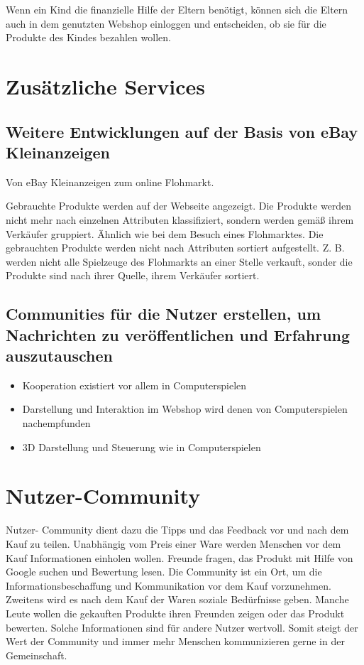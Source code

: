 Wenn ein Kind die finanzielle Hilfe der Eltern benötigt, können sich die Eltern auch in dem genutzten Webshop einloggen und entscheiden, ob sie für die Produkte des Kindes bezahlen wollen.


\section{Zusätzliche Services}


\subsection{Weitere Entwicklungen auf der Basis von eBay Kleinanzeigen}

Von eBay Kleinanzeigen zum online Flohmarkt.

Gebrauchte Produkte werden auf der Webseite angezeigt. Die Produkte werden nicht mehr nach einzelnen Attributen klassifiziert, sondern werden gemäß ihrem Verkäufer gruppiert. Ähnlich wie bei dem Besuch eines Flohmarktes. Die gebrauchten Produkte werden nicht nach Attributen sortiert aufgestellt. Z. B. werden nicht alle Spielzeuge des Flohmarkts an einer Stelle verkauft, sonder die Produkte sind nach ihrer Quelle, ihrem Verkäufer sortiert.


\subsection{Communities  für die Nutzer erstellen, um Nachrichten zu veröffentlichen und Erfahrung auszutauschen}

\begin{itemize}
\item Kooperation existiert vor allem in Computerspielen
\item Darstellung und Interaktion im Webshop wird denen von Computerspielen nachempfunden
\item 3D Darstellung und Steuerung wie in Computerspielen
\end{itemize}


\section{Nutzer-Community}

Nutzer- Community dient dazu die Tipps und das Feedback vor und nach dem Kauf zu teilen. Unabhängig vom Preis einer Ware werden Menschen vor dem Kauf Informationen einholen wollen. Freunde fragen, das Produkt mit Hilfe von Google suchen und Bewertung lesen. Die Community ist ein Ort, um die Informationsbeschaffung und Kommunikation vor dem Kauf vorzunehmen. Zweitens wird es nach dem Kauf der Waren soziale Bedürfnisse geben. Manche Leute wollen die gekauften Produkte ihren Freunden zeigen oder das Produkt bewerten. Solche Informationen sind für andere Nutzer wertvoll. Somit steigt der Wert der Community und immer mehr Menschen kommunizieren gerne in der Gemeinschaft.

